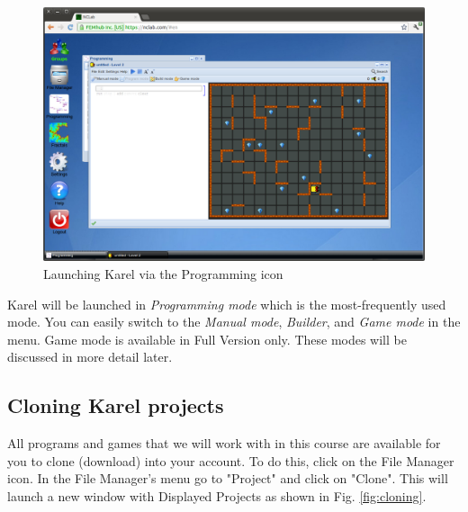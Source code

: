 \documentclass[article,A4,12pt]{llncs}
\begin{document}
\begin{figure}[!ht]
\begin{center}
\includegraphics[width=\textwidth]{img/init.png}
\end{center}
\caption{Launching Karel via the Programming icon}
\label{fig:init}
\end{figure}
\noindent
Karel will be launched in {\em Programming mode} which is the most-frequently 
used mode. You can easily switch to the {\em Manual mode}, {\em Builder},
and {\em Game mode} in the menu. Game mode is available in Full Version only. 
These modes will be discussed in more detail later.

\subsection{Cloning Karel projects} \label{cloning}

All programs and games that we will work with in this course are
available for you to clone (download) into your account. To do this, 
click on the File Manager icon. In the File Manager's menu go to 
"Project" and click on "Clone". This will launch a new window with
Displayed Projects as shown in Fig. \ref{fig:cloning}.

\newpage
\end{document}
